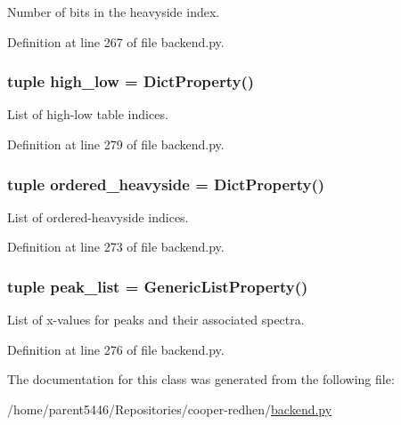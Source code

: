 Number of bits in the heavyside index. 

Definition at line 267 of file backend.py.\hypertarget{classbackend_1_1_matcher_abbbeca0d3792b2ad0d9046572fd7f16f}{
\subsubsection[{high\_\-low}]{\setlength{\rightskip}{0pt plus 5cm}tuple {\bf high\_\-low} = {\bf DictProperty}()}}
\label{classbackend_1_1_matcher_abbbeca0d3792b2ad0d9046572fd7f16f}


List of high-\/low table indices. 

Definition at line 279 of file backend.py.\hypertarget{classbackend_1_1_matcher_a57274e1e90ee992a9ae6b89edb934a43}{
\subsubsection[{ordered\_\-heavyside}]{\setlength{\rightskip}{0pt plus 5cm}tuple {\bf ordered\_\-heavyside} = {\bf DictProperty}()}}
\label{classbackend_1_1_matcher_a57274e1e90ee992a9ae6b89edb934a43}


List of ordered-\/heavyside indices. 

Definition at line 273 of file backend.py.\hypertarget{classbackend_1_1_matcher_a38ebd0204232520ab5a9d90a6c17b971}{
\subsubsection[{peak\_\-list}]{\setlength{\rightskip}{0pt plus 5cm}tuple {\bf peak\_\-list} = {\bf GenericListProperty}()}}
\label{classbackend_1_1_matcher_a38ebd0204232520ab5a9d90a6c17b971}


List of x-\/values for peaks and their associated spectra. 

Definition at line 276 of file backend.py.

The documentation for this class was generated from the following file:\begin{DoxyCompactItemize}
\item 
/home/parent5446/Repositories/cooper-\/redhen/\hyperlink{backend_8py}{backend.py}\end{DoxyCompactItemize}
